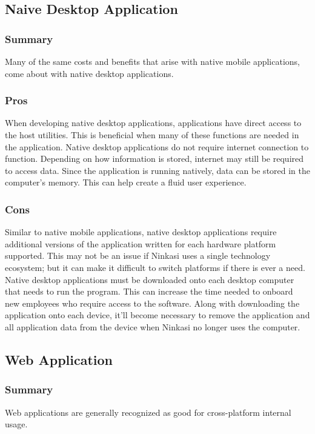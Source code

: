 \documentclass[draftclsnofoot,onecolumn,letterpaper,10pt,compsoc]{IEEEtran}
\begin{document}
    
	\subsection{Naive Desktop Application}
        \subsubsection{Summary}
            Many of the same costs and benefits that arise with native mobile applications, come about with native desktop applications.
        
        \subsubsection{Pros}
            When developing native desktop applications, applications have direct access to the host utilities. 
            This is beneficial when many of these functions are needed in the application.
            Native desktop applications do not require internet connection to function.
            Depending on how information is stored, internet may still be required to access data.
            Since the application is running natively, data can be stored in the computer's memory.
            This can help create a fluid user experience.
    
        \subsubsection{Cons}
            Similar to native mobile applications, native desktop applications require additional versions of the application written for each hardware platform supported.
            This may not be an issue if Ninkasi uses a single technology ecosystem; but it can make it difficult to switch platforms if there is ever a need.
            Native desktop applications must be downloaded onto each desktop computer that needs to run the program.
            This can increase the time needed to onboard new employees who require access to the software.
            Along with downloading the application onto each device, it'll become necessary to remove the application and all application data from the device when Ninkasi no longer uses the computer.
    
    
	\subsection{Web Application}
        \subsubsection{Summary}
            Web applications are generally recognized as good for cross-platform internal usage\cite{SearchCloudOverview}.
    
\end{document}
